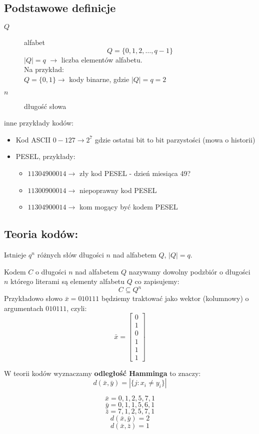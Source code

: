 \subsection{Podstawowe definicje}
\begin{description}
\item[$Q$] alfabet $$Q=\{0,1,2,\dots ,q-1\}$$
$|Q|=q$ $\rightarrow$ liczba elementów alfabetu.\\
Na przykład:\\
$Q=\{0,1\}\rightarrow$ kody binarne, gdzie $|Q|=q=2$
\item[$n$] długość słowa
\end{description}
inne przykłady kodów:
\begin{itemize}
\item Kod ASCII $0-127\rightarrow 2^7$ gdzie ostatni bit to bit parzystości (mowa o historii)
\item PESEL, przykłady:
\begin{itemize}
\item[] $11304900014\rightarrow$ zły kod PESEL - dzień miesiąca 49? 
\item[] $11300900014\rightarrow$ niepoprawny kod PESEL
\item[] $11304900014\rightarrow$ kom mogący być kodem PESEL
\end{itemize}
\end{itemize}

\subsection{Teoria kodów:}
\begin{observation*}
Istnieje $q^n$ różnych słów długości $n$ nad alfabetem $Q$, $|Q|=q$.
\end{observation*}
\begin{definition}[Kod]
Kodem $C$ o długości $n$ nad alfabetem $Q$ nazywamy dowolny podzbiór o długości $n$ którego literami są elementy alfabetu $Q$ co zapisujemy: $$C\subseteq Q^n$$
Przykładowo słowo $\bar{x}=010111$ będziemy traktować jako wektor (kolumnowy) o argumentach $010111$, czyli: $$\bar{x}=\begin{bmatrix}
0\\1\\0\\1\\1\\1
\end{bmatrix}$$
\end{definition}
\begin{definition}
W teorii kodów wyznaczamy \textbf{odległość Hamminga} to znaczy: $$d(\bar{x},\bar{y})=|\{j:x_i\neq y_i\}|$$
\begin{multicols}{2}
$$\bar{x}=0,1,2,5,7,1$$
$$\bar{y}=0,1,1,5,6,1$$
$$\bar{z}=7,1,2,5,7,1$$
\vfill\null
\columnbreak
$$d(\bar{x},\bar{y})=2$$
$$d(\bar{x},\bar{z})=1$$
\end{multicols}
\end{definition}

